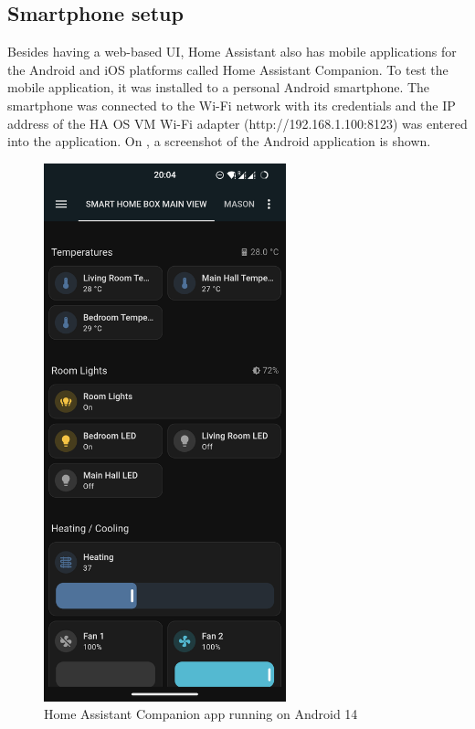 \subsection{Smartphone setup}

Besides having a web-based UI, Home Assistant also has mobile applications for the Android and iOS platforms called Home Assistant Companion. \cite{HACompanion} To test the mobile application, it was installed to a personal Android smartphone. The smartphone was connected to the Wi-Fi network with its credentials and the IP address of the HA OS VM Wi-Fi adapter (http://192.168.1.100:8123) was entered into the application. On , a screenshot of the Android application is shown.

\begin{figure}[!ht]
  \centering
  \includegraphics[width=70mm, keepaspectratio]{figures/homeassistant_android_screenshot.png}
  \caption{Home Assistant Companion app running on Android 14}
  \label{fig:HAandroidScreenshot}
\end{figure}

